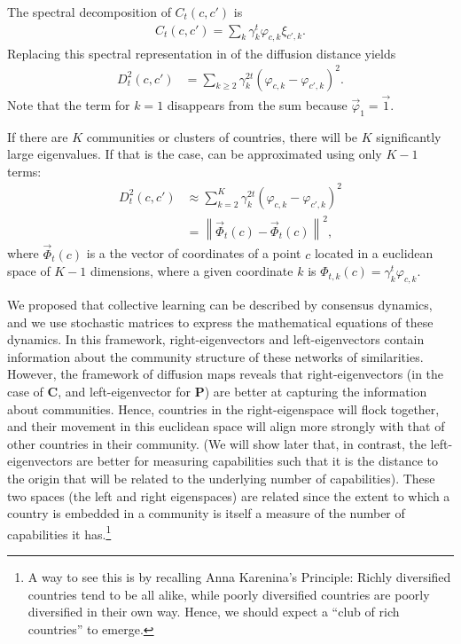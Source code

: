 \documentclass[12pt]{article}
\newcommand{\mtx}[1]{\mathbf{ #1}}
\begin{document}
The spectral decomposition of $C_t(c,c')$ is
\begin{align}
	C_t(c,c') = \sum_k \gamma_k^t \varphi_{c,k} \xi_{c',k}.
\end{align}
Replacing this spectral representation in  of the diffusion distance yields
\begin{align}
	D_t^2(c,c') &= \sum_{k\geq 2} \gamma_k^{2t} \left(\varphi_{c,k} - \varphi_{c',k}\right)^2.
\label{eq_diffdisteig}
\end{align}
Note that the term for $k=1$ disappears from the sum because $\vec{\varphi}_1 = \vec{1}$. 

If there are $K$ communities or clusters of countries, there will be $K$ significantly large eigenvalues. If that is the case,  can be approximated using only $K-1$ terms:
\begin{align}
	D_t^2(c,c') &\approx \sum_{k = 2}^{K} \gamma_k^{2t} \left(\varphi_{c,k} - \varphi_{c',k}\right)^2 \nonumber\\
	&=\left\| \vec{\Phi}_t(c) - \vec{\Phi}_t(c) \right\|^2,
\label{eq_diffdisteigapprox}
\end{align}
where $\vec{\Phi}_t(c)$ is a the vector of coordinates of a point $c$ located in a euclidean space of $K-1$ dimensions, where a given coordinate $k$ is $\Phi_{t,k}(c) = \gamma_k^{t}\varphi_{c,k}$.


We proposed that collective learning can be described by consensus dynamics, and we use stochastic matrices to express the mathematical equations of these dynamics. In this framework, right-eigenvectors and left-eigenvectors contain information about the community structure of these networks of similarities. However, the framework of diffusion maps reveals that right-eigenvectors (in the case of $\mtx{C}$, and left-eigenvector for $\mtx{P}$) are better at capturing the information about communities. Hence, countries in the right-eigenspace will flock together, and their movement in this euclidean space will align more strongly with that of other countries in their community. (We will show later that, in contrast, the left-eigenvectors are better for measuring capabilities such that it is the distance to the origin that will be related to the underlying number of capabilities). These two spaces (the left and right eigenspaces) are related since the extent to which a country is embedded in a community is itself a measure of the number of capabilities it has.\footnote{A way to see this is by recalling Anna Karenina's Principle: Richly diversified countries tend to be all alike, while poorly diversified countries are poorly diversified in their own way. Hence, we should expect a ``club of rich countries'' to emerge.}
\end{document}
